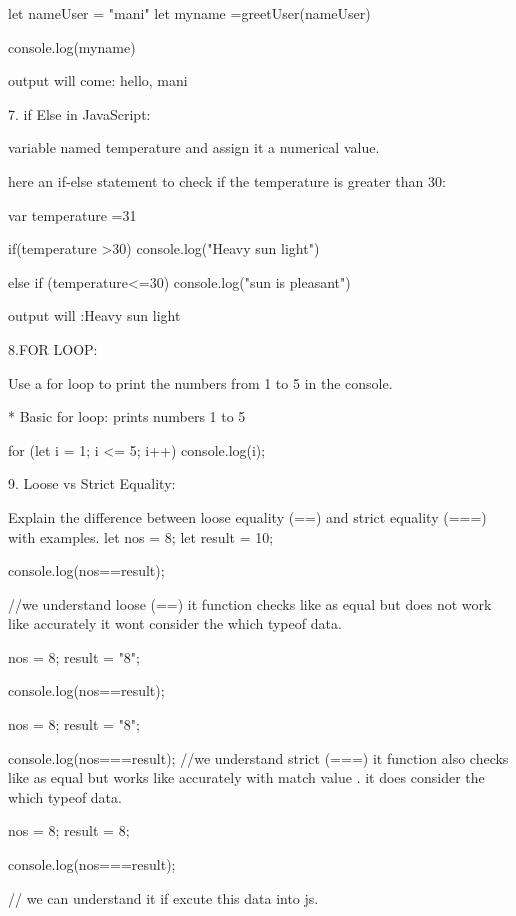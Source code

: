  let nameUser = "mani"
 let myname =greetUser(nameUser)
 
 console.log(myname)

      output will come: hello, mani

7. if Else in JavaScript:

 variable named temperature and assign it a numerical value.

here an if-else statement to check if the temperature is greater than 30:


var temperature =31

if(temperature >30)
{console.log("Heavy sun light")}

else if (temperature<=30)
{console.log("sun is pleasant")}

output will :Heavy sun light



8.FOR LOOP:

Use a for loop to print the numbers from 1 to 5 in the console.


* Basic for loop: prints numbers 1 to 5

for (let i = 1; i <= 5; i++) {
    console.log(i);
  }

 9. Loose vs Strict Equality:

Explain the difference between loose equality (==) and strict equality (===) with examples.
let nos = 8;
let result = 10;

console.log(nos==result);

//we understand loose (==) it function checks like as equal but does not work like accurately it wont consider the which typeof data.

 nos = 8;
 result = "8";

console.log(nos==result);


nos = 8;
 result = "8";

console.log(nos===result);
//we understand strict (===) it function also checks like as equal but works like accurately with match value . it does consider the which typeof data.

nos = 8;
 result = 8;

console.log(nos===result);

// we can understand it if excute this data into js.









    

     


          